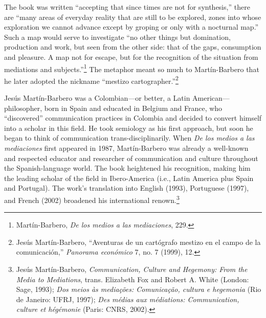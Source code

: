 \documentclass{tufte-handout}
\begin{document}
The  book was written\setcounter{footnote}{5} ``accepting that since times are not for
synthesis,'' there are ``many areas of everyday reality that are still
to be explored, zones into whose exploration we cannot advance except by
groping or only with a nocturnal map.'' Such a map would serve to
investigate ``no other things but domination, production and work, but
seen from the other side: that of the gaps, consumption and pleasure. A
map not for escape, but for the recognition of the situation from
mediations and subjects.''\footnote{Martín-Barbero, \emph{De los medios a las mediaciones}, 229.
} The
metaphor meant so much to Martín-Barbero that he later adopted the
nickname ``mestizo cartographer.''\footnote{Jesús Martín-Barbero, ``Aventuras de un cartógrafo mestizo en el campo
  de la comunicación,'' \emph{Panorama económico} 7, no. 7 (1999), 12.
}

Jesús Martín-Barbero was a Colombian---or better, a Latin
American---philosopher, born in Spain and educated in Belgium and
France, who ``discovered'' communication practices in Colombia and
decided to convert himself into a scholar in this field. He took
semiology as his first approach, but soon he began to think of
communication trans-disciplinarily. When \emph{De los medios a las
mediaciones} first appeared in 1987, Martín-Barbero was already a
well-known and respected educator and researcher of communication and
culture throughout the Spanish-language world. The book heightened his
recognition, making him the leading scholar of the field in
Ibero-America (i.e., Latin America plus Spain and Portugal). The work's
translation into English (1993), Portuguese (1997), and French (2002)
broadened his international
renown.\footnote{Jesús Martín-Barbero, \emph{Communication, Culture and Hegemony: From
  the Media to Mediations}, trans. Elizabeth Fox and Robert A. White
  (London: Sage, 1993); \emph{Dos meios às mediações: Comunicação,
  cultura e hegemonia} (Rio de Janeiro: UFRJ, 1997); \emph{Des médias
  aux médiations: Communication, culture et hégémonie} (Paris: CNRS,
  2002).
}
\end{document}
